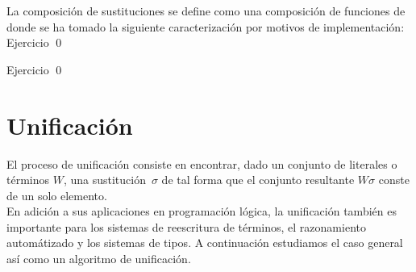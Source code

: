 \documentclass[11pt,letterpaper]{article}
\begin{document}
La composición de sustituciones se define como una composición de funciones de 
donde se ha tomado la siguiente caracterización por motivos de implementación:
\proof
Ejercicio
\qed

\proof
Ejercicio
\qed



\section{Unificaci\'on}

El proceso de unificaci\'on consiste en encontrar, dado un conjunto de 
literales o t\'erminos $W$, una sustitución~$\sigma$ de tal forma que el 
conjunto resultante $W\sigma$ conste de un solo elemento. \\
En adici\'on a sus aplicaciones en programaci\'on l\'ogica, la
unificaci\'on tambi\'en es importante para los sistemas de reescritura de
t\'erminos, el razonamiento autom\'atizado y los sistemas de tipos.
A continuación estudiamos el caso general así como un algoritmo de unificación.
\end{document}
